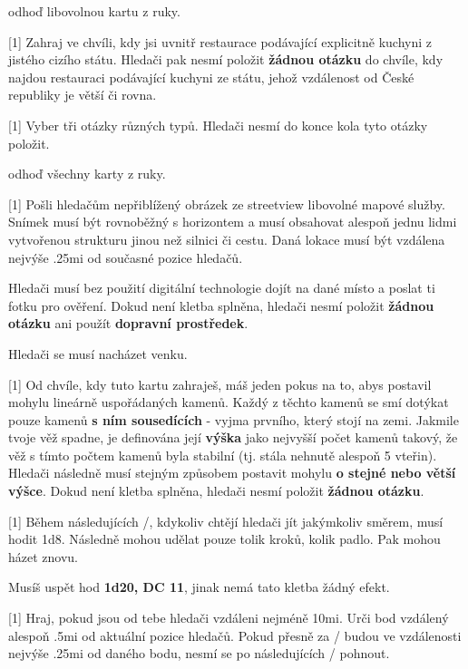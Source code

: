 \begin{cards}
	\cost odhoď libovolnou kartu z ruky.

	 Zahraj ve chvíli, kdy jsi uvnitř restaurace podávající explicitně kuchyni z jistého cizího státu. Hledači pak nesmí položit \textbf{žádnou otázku} do chvíle, kdy najdou restauraci podávající kuchyni ze státu, jehož vzdálenost od České republiky je větší či rovna.

	 Vyber tři otázky různých typů. Hledači nesmí do konce kola tyto otázky položit.

	\cost odhoď všechny karty z ruky.

	 Pošli hledačům nepřiblížený obrázek ze streetview libovolné mapové služby. Snímek musí být rovnoběžný s horizontem a musí obsahovat alespoň jednu lidmi vytvořenou strukturu jinou než silnici či cestu. Daná lokace musí být vzdálena nejvýše \dist.25mi od současné pozice hledačů.

	Hledači musí bez použití digitální technologie dojít na dané místo a poslat ti fotku pro ověření. Dokud není kletba splněna, hledači nesmí položit \textbf{žádnou otázku} ani použít \textbf{dopravní prostředek}.

	\cost Hledači se musí nacházet venku.

	 Od chvíle, kdy tuto kartu zahraješ, máš jeden pokus na to, abys postavil mohylu lineárně uspořádaných kamenů. Každý z těchto kamenů se smí dotýkat pouze kamenů \textbf{s ním sousedících} - vyjma prvního, který stojí na zemi. Jakmile tvoje věž spadne, je definována její \textbf{výška} jako nejvyšší počet kamenů takový, že věž s tímto počtem kamenů byla stabilní (tj. stála nehnutě alespoň 5 vteřin). Hledači následně musí stejným způsobem postavit mohylu \textbf{o stejné nebo větší výšce}. Dokud není kletba splněna, hledači nesmí položit \textbf{žádnou otázku}.

	 Během následujících \timecursegambler/, kdykoliv chtějí hledači jít jakýmkoliv směrem, musí hodit 1d8. Následně mohou udělat pouze tolik kroků, kolik padlo. Pak mohou házet znovu.

	\cost Musíš uspět hod \textbf{1d20, DC 11}, jinak nemá tato kletba žádný efekt.

	 Hraj, pokud jsou od tebe hledači vzdáleni nejméně \dist10mi. Urči bod vzdálený alespoň \dist.5mi od aktuální pozice hledačů. Pokud přesně za \timecursedotcountdown/ budou ve vzdálenosti nejvýše \dist.25mi od daného bodu, nesmí se po následujících \timecursedotfreeze/ pohnout.


\end{cards}
